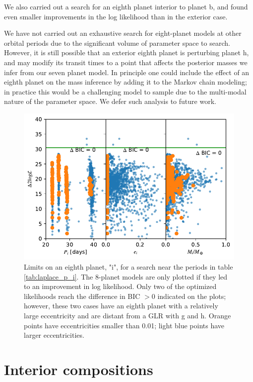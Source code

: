 \documentclass[twocolumn]{aastex63}
\begin{document}
We also carried out a search for an eighth planet interior to planet
b, and found even smaller improvements in the log likelihood than
in the exterior case.

We have not carried out an exhaustive search for eight-planet models
at other orbital periods due to the significant volume of parameter
space to search.   However, it is still possible that an exterior
eighth planet is perturbing planet h, and may modify its transit
times to a point that affects the posterior masses we infer from
our seven planet model.   In principle one could include the effect
of an eighth planet on the mass inference by adding it to the Markov
chain modeling;  in practice this would be a challenging model to
sample due to the multi-modal nature of the parameter space.
We defer such analysis to future work.

\begin{figure}
    \centering
    \includegraphics[width=\hsize]{figures/Planet_i_properties.pdf}
    \caption{Limits on an eighth planet, "i", for a search near
    the periods in table \ref{tab:laplace_p_i}.  The 8-planet
    models are only plotted if they led to an improvement in log likelihood.  
    Only two of the optimized
    likelihoods reach the difference in BIC ${>}0$ indicated on the plots; however, these two cases have an eighth planet with a relatively large eccentricity and are distant from a GLR with g and h.  Orange points have eccentricities smaller than 0.01;  light blue points have larger eccentricities.}
    \label{fig:planet_i}
\end{figure}


\section{Interior compositions}
\label{sec:theoretical_interpretation}
\end{document}
